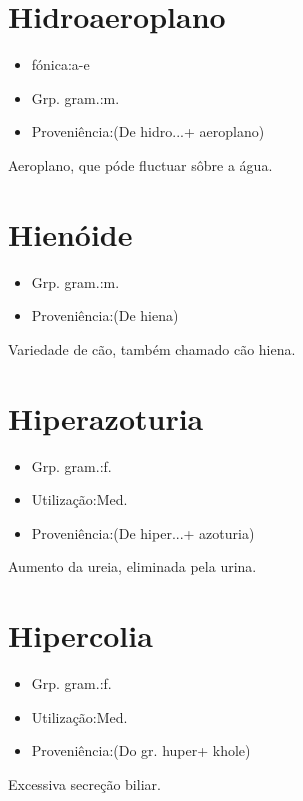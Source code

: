\documentclass{article}
\begin{document}
\section{Hidroaeroplano}
\begin{itemize}
\item {fónica:a-e}
\end{itemize}
\begin{itemize}
\item {Grp. gram.:m.}
\end{itemize}
\begin{itemize}
\item {Proveniência:(De \textunderscore hidro...\textunderscore  + \textunderscore aeroplano\textunderscore )}
\end{itemize}
Aeroplano, que póde fluctuar sôbre a água.
\section{Hienóide}
\begin{itemize}
\item {Grp. gram.:m.}
\end{itemize}
\begin{itemize}
\item {Proveniência:(De \textunderscore hiena\textunderscore )}
\end{itemize}
Variedade de cão, também chamado \textunderscore cão hiena\textunderscore .
\section{Hiperazoturia}
\begin{itemize}
\item {Grp. gram.:f.}
\end{itemize}
\begin{itemize}
\item {Utilização:Med.}
\end{itemize}
\begin{itemize}
\item {Proveniência:(De \textunderscore hiper...\textunderscore  + \textunderscore azoturia\textunderscore )}
\end{itemize}
Aumento da ureia, eliminada pela urina.
\section{Hipercolia}
\begin{itemize}
\item {Grp. gram.:f.}
\end{itemize}
\begin{itemize}
\item {Utilização:Med.}
\end{itemize}
\begin{itemize}
\item {Proveniência:(Do gr. \textunderscore huper\textunderscore  + \textunderscore khole\textunderscore )}
\end{itemize}
Excessiva secreção biliar.
\end{document}
